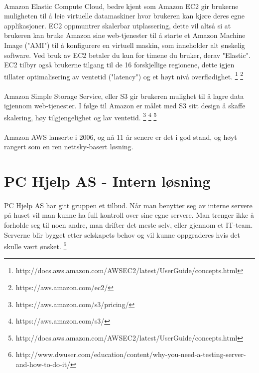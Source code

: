 \paragraph{}Amazon Elastic Compute Cloud, bedre kjent som Amazon EC2 gir brukerne muligheten til å leie virtuelle datamaskiner hvor brukeren kan kjøre deres egne applikasjoner. EC2 oppmuntrer skalerbar utplassering, dette vil altså si at brukeren kan bruke Amazon sine web-tjenester til å starte et Amazon Machine Image ("AMI") til å konfigurere en virtuell maskin, som inneholder alt ønskelig software. Ved bruk av EC2 betaler du kun for timene du bruker, derav "Elastic". EC2 tilbyr også brukerne tilgang til de 16 forskjellige regionene, dette igjen tillater optimalisering av ventetid ("latency") og et høyt nivå overflødighet.
\footnote{http://docs.aws.amazon.com/AWSEC2/latest/UserGuide/concepts.html}
\footnote{https://aws.amazon.com/ec2/}


\paragraph{}Amazon Simple Storage Service, eller S3 gir brukeren mulighet til å lagre data igjennom web-tjenester. I følge til Amazon er målet med S3 sitt design å skaffe skalering, høy tilgjengelighet og lav ventetid.
\footnote{ https://aws.amazon.com/s3/pricing/ }
\footnote{ https://aws.amazon.com/s3/ }
\footnote{http://docs.aws.amazon.com/AWSEC2/latest/UserGuide/concepts.html}
\paragraph{}Amazon AWS lanserte i 2006, og nå 11 år senere er det i god stand, og høyt rangert som en ren nettsky-basert løsning.


\section{PC Hjelp AS - Intern løsning}
\paragraph{}PC Hjelp AS har gitt gruppen et tilbud. Når man benytter seg av interne servere på huset vil man kunne ha full kontroll over sine egne servere. Man trenger ikke å forholde seg til noen andre, man drifter det meste selv, eller gjennom et IT-team. Serverne blir bygget etter selskapets behov og vil kunne oppgraderes hvis det skulle vært ønsket.
\footnote{http://www.dwuser.com/education/content/why-you-need-a-testing-server-and-how-to-do-it/}



